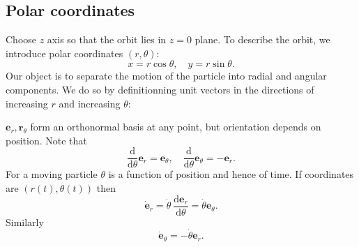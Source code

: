\subsection{Polar coordinates}
Choose $z$ axis so that the orbit lies in $z=0$ plane. To describe the orbit, we introduce polar coordinates $(r, \theta)$:
\[
  x = r\cos\theta, \quad y = r\sin \theta.
\]
Our object is to separate the motion of the particle into radial and angular components. We do so by definitionning unit vectors in the directions of increasing $r$ and increasing $\theta$:
\begin{center}
\end{center}
$ \mathbf{e}_r,\mathbf{r}_\theta $ form an orthonormal basis at any point, but orientation depends on position. Note that 
\[
    \frac{\mathrm{d}}{\mathrm{d}\theta}\mathbf{e}_r = \mathbf{e}_\theta ,\quad \frac{\mathrm{d}}{\mathrm{d}\theta}\mathbf{e}_\theta=-\mathbf{e}_r. 
\]
For a moving particle $ \theta $ is a function of position and hence of time. If coordinates are $ (r(t),\theta(t)) $ then
\[
    \dot{\mathbf{e}}_r = \dot{\theta}\ \frac{\mathrm{d}\mathbf{e}_r}{\mathrm{d}\theta} = \dot{\theta}\mathbf{e}_\theta .
\]
Similarly
\[
    \dot{\mathbf{e}}_\theta = - \dot{\theta}\mathbf{e}_r.
\]

